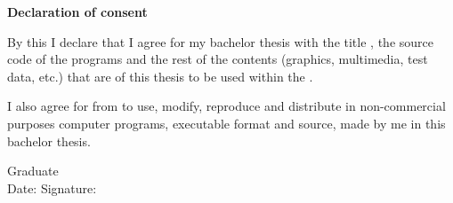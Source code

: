 \vspace*{\fill}
\begin{center}
    \large
    \textbf{Declaration of consent}
\end{center}

By this I declare that I agree for my bachelor thesis with the title \textbf{\thesistitle}, the source code of the programs and the rest of the contents (graphics, multimedia, test data, etc.) that are of this thesis to be used within the \facultyg.

I also agree for \faculty \space from \university \space to use, modify, reproduce and distribute in non-commercial purposes computer programs, executable format and source, made by me in this bachelor thesis.

\begin{flushright}
    Graduate \textbf{\authornamefl} \\
    \vspace{0.5cm}
    Date: \dottedline \hspace{6cm} Signature: \dottedline
\end{flushright}
\vspace*{\fill}
\pagebreak